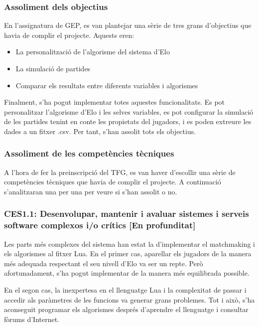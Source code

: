 \documentclass[a4paper]{article}
\begin{document}
\subsubsection{Assoliment dels objectius}
En l'assignatura de GEP, es van plantejar una sèrie de tres grans d'objectius que havia de complir el projecte. Aquests eren:

\begin{itemize}
    \item La personalització de l'algorisme del sistema d'Elo
    \item La simulació de partides
    \item Comparar els resultats entre diferents variables i algorismes
\end{itemize}   

Finalment, s'ha pogut implementar totes aquestes funcionalitats. Es pot personalitzar l'algorisme d'Elo i les selves variables, es pot configurar la simulació de les partides tenint en conte les propietats del jugadors, i es poden extreure les dades a un fitxer .csv. Per tant, s'han assolit tots els objectius.

\subsubsection{Assoliment de les competències tècniques}

A l'hora de fer la preinscripció del TFG, es van haver d'escollir una sèrie de competències tècniques que havia de complir el projecte. A continuació s'analitzaran una per una per veure si s'han assolit o no.

\subsubsection*{CES1.1: Desenvolupar, mantenir i avaluar sistemes i serveis software complexos i/o crítics [En profunditat]}

Les parts més complexes del sistema han estat la d'implementar el matchmaking i els algorismes al fitxer Lua. En el primer cas, aparellar els jugadors de la manera més adequada respectant el seu nivell d'Elo va ser un repte. Però afortunadament, s'ha pogut implementar de la manera més equilibrada possible.

En el segon cas, la inexpertesa en el llenguatge Lua i la complexitat de passar i accedir als paràmetres de les funcions va generar grans problemes. Tot i això, s'ha aconseguit programar els algorismes després d'aprendre el llenguatge i consultar fòrums d'Internet.
\end{document}
